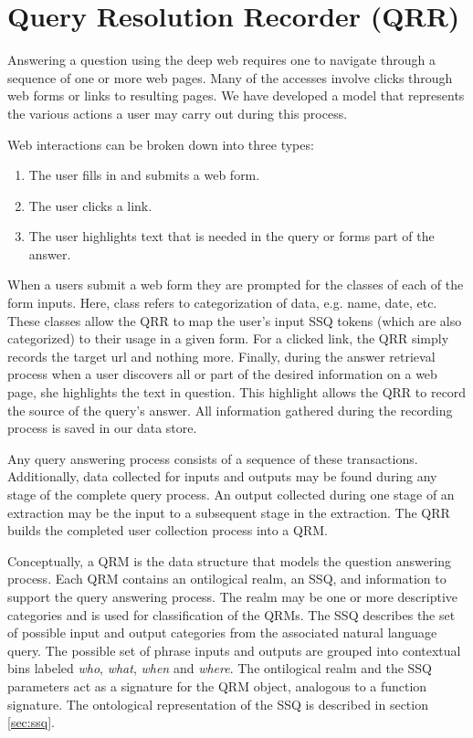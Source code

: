 \section{Query Resolution Recorder (QRR)}
\label{sec:qrr}
Answering a question using the deep web requires one to navigate
through a sequence of one or more web pages. Many of the accesses
involve clicks through web forms or links to resulting pages.  We have
developed a model that represents the various actions a user may carry
out during this process.

Web interactions can be broken down into three types:
\begin{enumerate}
\item The user fills in and submits a web form.
\item The user clicks a link.
\item The user highlights text that is needed in the query or forms
  part of the answer.
\end{enumerate}

When a users submit a web form they are prompted for the classes of
each of the form inputs. Here, class refers to categorization of data,
e.g. name, date, etc. These classes allow the QRR to map the user's
input SSQ tokens (which are also categorized) to their usage in a
given form. For a clicked link, the QRR simply records the target url
and nothing more. Finally, during the answer retrieval process when a
user discovers all or part of the desired information on a web page,
she highlights the text in question. This highlight allows the QRR to
record the source of the query's answer. All information gathered
during the recording process is saved in our data store.

Any query answering process consists of a sequence of these transactions.
Additionally, data collected for inputs and outputs may be found
during any stage of the complete query process.  An output
collected during one stage of an extraction may be the input to a
subsequent stage in the extraction.  The QRR builds the completed user
collection process into a QRM.  

Conceptually, a QRM is the data structure that models the question
answering process.  Each QRM contains an ontilogical realm, an SSQ,
and information to support the query answering process.  The realm may
be one or more descriptive categories and is used for classification
of the QRMs.  The SSQ describes the set of possible input and output
categories from the associated natural language query.  The possible
set of phrase inputs and outputs are grouped into contextual bins
labeled \emph{who}, \emph{what}, \emph{when} and \emph{where}.  The
ontilogical realm and the SSQ parameters act as a signature for the
QRM object, analogous to a function signature.  The ontological
representation of the SSQ is described in section \ref{sec:ssq}.

